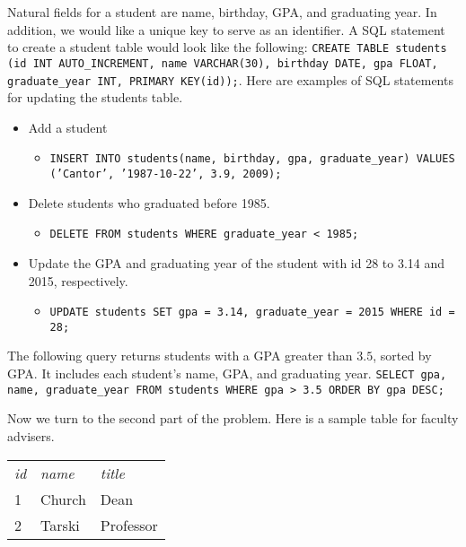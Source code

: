 \documentclass[10pt,openany,twoside,letterpaper,extrafontsizes]{memoir}
\begin{document}
\begin{Spacing}{\commonToolsSpacing}

\label{solution-sql-design}
Natural fields for a student are name, birthday, GPA, and graduating
year. In addition, we would like a unique key to serve as an identifier.
A SQL statement to create a student table would look like the following:
\texttt{CREATE TABLE students (id INT AUTO\_INCREMENT, name VARCHAR(30), birthday DATE, gpa FLOAT, graduate\_year INT, PRIMARY KEY(id));}.
Here are examples of SQL statements for updating the students table.
\begin{itemize}
\item Add a student
\begin{itemize}
\item \texttt{INSERT INTO students(name, birthday, gpa, graduate\_year) VALUES ('Cantor', '1987-10-22', 3.9, 2009);}
\end{itemize}
\item Delete students  who graduated before 1985.
\begin{itemize}
\item \texttt{DELETE FROM students WHERE graduate\_year < 1985;}
\end{itemize}
\item Update the GPA and graduating year of the student with id 28 to 3.14 and 2015, respectively.
\begin{itemize}
\item \texttt{UPDATE students SET gpa = 3.14, graduate\_year = 2015 WHERE id = 28;}
\end{itemize}
\end{itemize}

The following query returns students with a GPA greater than $3.5$, sorted by GPA.
It includes each student's name, GPA, and graduating year.
\texttt{SELECT gpa, name, graduate\_year FROM students WHERE gpa > 3.5 ORDER BY gpa DESC;}

Now we turn to the second part
of the problem. Here is a sample table for faculty advisers.
\begin{center}
\begin{tabular}{|lll|} \hline
{\em id} &  {\em name} & {\em title} \\
1 & Church & Dean \\
2 & Tarski & Professor \\
\hline
\end{tabular}
\end{center}


\end{Spacing}
\end{document}
